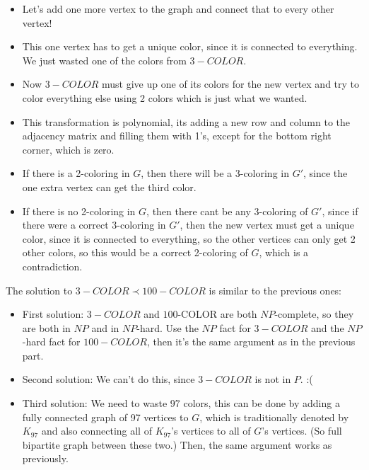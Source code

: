 \begin{itemize}
    \item Let's add one more vertex to the graph and connect that to every other vertex!
    \item This one vertex has to get a unique color, since it is connected to everything. We just wasted one of the colors from $3-COLOR$.
    \item Now $3-COLOR$ must give up one of its colors for the new vertex and try to color everything else using 2 colors which is just what we wanted.
    \item This transformation is polynomial, its adding a new row and column to the adjacency matrix and filling them with 1's, except for the bottom right corner, which is zero.
    \item If there is a 2-coloring in $G$, then there will be a 3-coloring in $G'$, since the one extra vertex can get the third color.
    \item If there is no 2-coloring in $G$, then there cant be any 3-coloring of $G'$, since if there were a correct 3-coloring in $G'$, then the new vertex must get a unique color, since it is connected to everything, so the other vertices can only get 2 other colors, so this would be a correct 2-coloring of $G$, which is a contradiction.
\end{itemize}

The solution to $3-COLOR \prec 100-COLOR$ is similar to the previous ones:

\begin{itemize}
    \item First solution: $3-COLOR$ and $100$-COLOR are both $NP$-complete, so they are both in $NP$ and in $NP$-hard. Use the $NP$ fact for $3-COLOR$ and the $NP$-hard fact for $100-COLOR$, then it's the same argument as in the previous part.
    \item Second solution: We can't do this, since $3-COLOR$ is not in $P$. :(
    \item Third solution: We need to waste 97 colors, this can be done by adding a fully connected graph of 97 vertices to $G$, which is traditionally denoted by $K_{97}$ and also connecting all of $K_{97}$'s vertices to all of $G$'s vertices. (So full bipartite graph between these two.) Then, the same argument works as previously.
\end{itemize}